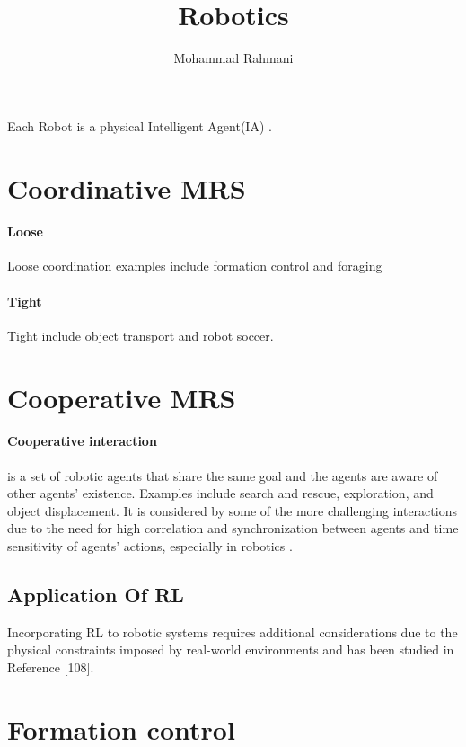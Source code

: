 \documentclass{article}
\begin{document}
	
	\title{Robotics}
	\author{Mohammad Rahmani}
	\date{}
	\maketitle
	Each Robot is a physical Intelligent Agent(IA) \citep{rizk-2018-decision-making-in-multiagent-systems-a-survey}.  
	\section{Coordinative MRS}
		\paragraph{Loose}
		Loose coordination examples include formation control and foraging
		\paragraph{Tight}
		Tight include object transport and robot soccer.
	\section{Cooperative MRS}
		\paragraph{Cooperative interaction}  is a set of robotic agents that share the same goal and the agents are aware of other agents’ existence. Examples include search and rescue, exploration, and object  displacement\citep{rizk-2018-decision-making-in-multiagent-systems-a-survey}. It is considered
		by some of the more challenging interactions due to the need for high correlation and synchronization between agents
		and time sensitivity of agents’ actions, especially in robotics  \citep{rizk-2018-decision-making-in-multiagent-systems-a-survey}. 
		\subsection{Application Of RL} Incorporating RL to robotic systems requires additional considerations due to
		the physical constraints imposed by real-world environments and has been studied in Reference
		\citet{rizk-2019-cooperative-heterogeneous-multi-robot-systems-a-survey}[108].
		 
    \section{Formation control}
    	\cite{}
\end{document}
